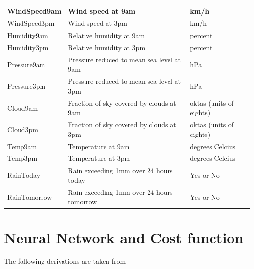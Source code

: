 \documentclass[11pt]{article}
\begin{document}
\begin{table}[H]
\begin{small}
\begin{center}
\begin{tabular}{|l|l|l|}
                \hline
                WindSpeed9am     & Wind speed at 9am                                    & km/h                    \\
                \hline
                WindSpeed3pm     & Wind speed at 3pm                                    & km/h                    \\
                \hline
                Humidity9am      & Relative humidity at 9am                             & percent                 \\
                \hline
                Humidity3pm      & Relative humidity at 3pm                             & percent                 \\
                \hline
                Pressure9am      & Pressure reduced to mean sea level at 9am            & hPa                     \\
                \hline
                Pressure3pm      & Pressure reduced to mean sea level at 3pm            & hPa                     \\
                \hline
                Cloud9am         & Fraction of sky covered by clouds at 9am             & oktas (units of eights) \\
                \hline
                Cloud3pm         & Fraction of sky covered by clouds at 3pm             & oktas (units of eights) \\
                \hline
                Temp9am          & Temperature at 9am                                   & degrees Celcius         \\
                \hline
                Temp3pm          & Temperature at 3pm                                   & degrees Celcius         \\
                \hline
                RainToday        & Rain exceeding 1mm over 24 hours today               & Yes or No               \\
                \hline
                RainTomorrow     & Rain exceeding 1mm over 24 hours tomorrow            & Yes or No               \\
                \hline
            \end{tabular}
        \end{center}
    \end{small}
\end{table}

\section{Neural Network and Cost function}
\label{app:NN}
The following derivations are taken from \cite{project2}
\end{document}
